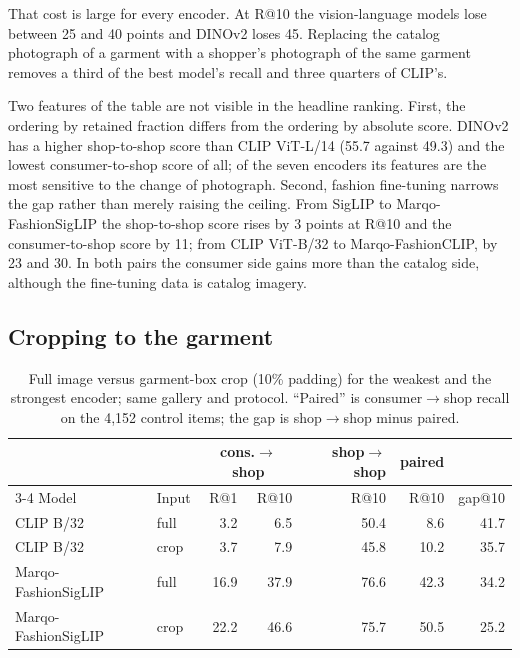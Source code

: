 \documentclass[10pt,twocolumn,letterpaper]{article}
\makeatletter
\newcommand{\recall}[1]{R@#1}
\makeatother
\begin{document}
That cost is large for every encoder. At \recall{10} the vision-language models lose between 25 and 40 points and DINOv2 loses 45. Replacing the catalog photograph of a garment with a shopper's photograph of the same garment removes a third of the best model's recall and three quarters of CLIP's.

Two features of the table are not visible in the headline ranking. First, the ordering by retained fraction differs from the ordering by absolute score. DINOv2 has a higher shop-to-shop score than CLIP ViT-L/14 (55.7 against 49.3) and the lowest consumer-to-shop score of all; of the seven encoders its features are the most sensitive to the change of photograph. Second, fashion fine-tuning narrows the gap rather than merely raising the ceiling. From SigLIP to Marqo-FashionSigLIP the shop-to-shop score rises by 3 points at \recall{10} and the consumer-to-shop score by 11; from CLIP ViT-B/32 to Marqo-FashionCLIP, by 23 and 30. In both pairs the consumer side gains more than the catalog side, although the fine-tuning data is catalog imagery.

\subsection{Cropping to the garment}
\label{sec:crop}

\begin{table}[t]
\centering\small
\caption{Full image versus garment-box crop (10\% padding) for the weakest and the strongest encoder; same gallery and protocol. ``Paired'' is consumer$\to$shop recall on the 4,152 control items; the gap is shop$\to$shop minus paired.}
\label{tab:crop}
\footnotesize
\setlength{\tabcolsep}{3pt}
\begin{tabular}{@{}llrrrrr@{}}
\toprule
 & & \multicolumn{2}{c}{cons.$\to$shop} & shop$\to$shop & paired & \\
\cmidrule(lr){3-4}
Model & Input & \recall{1} & \recall{10} & \recall{10} & \recall{10} & gap@10 \\
\midrule
CLIP B/32 & full  & 3.2 & 6.5 & 50.4 & 8.6 & 41.7 \\
CLIP B/32 & crop  & 3.7 & 7.9 & 45.8 & 10.2 & 35.7 \\
\addlinespace
Marqo-FashionSigLIP & full & 16.9 & 37.9 & 76.6 & 42.3 & 34.2 \\
Marqo-FashionSigLIP & crop & 22.2 & 46.6 & 75.7 & 50.5 & 25.2 \\
\bottomrule
\end{tabular}
\end{table}
\end{document}
